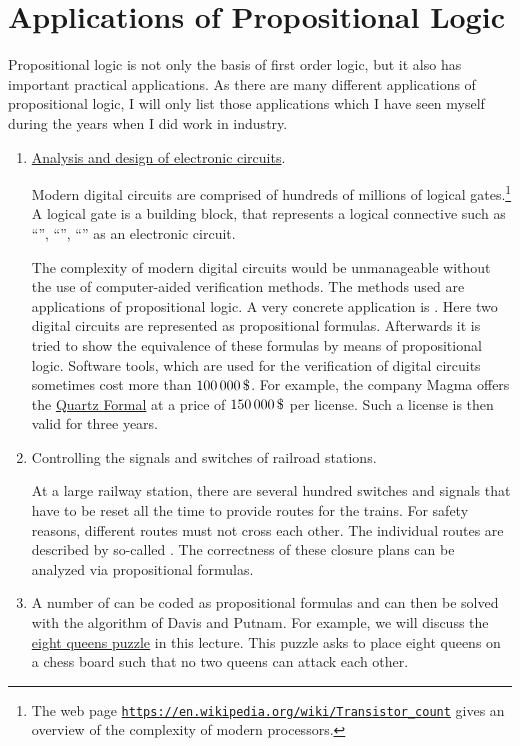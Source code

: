 \section{Applications of Propositional Logic}
Propositional logic is not only the basis of first order logic, but it also has important practical
applications.  As there are many different applications of propositional logic, I will only list those
applications which I have seen myself during the years when I did work in industry.
\begin{enumerate}
\item \href{https://en.wikipedia.org/wiki/Electronic_design_automation}{Analysis and design of electronic circuits}.

      Modern digital circuits are comprised of hundreds of millions of logical gates.\footnote{The web page
      \href{https://en.wikipedia.org/wiki/Transistor_count}{\texttt{https://en.wikipedia.org/wiki/Transistor\_count}}
      gives an overview of the complexity of modern processors.}
      A logical gate  is a building block, that represents a logical connective such as ``'',
      ``'', ``'' as an electronic circuit.

      The complexity of modern digital circuits would be unmanageable without
      the use of computer-aided verification methods.  The methods used are applications of propositional logic. 
      A very concrete application is .  Here two
      digital circuits are represented as propositional formulas.
      Afterwards it is tried to show the equivalence of these formulas by means of propositional logic.
      Software tools, which are used for the verification of digital
      circuits sometimes cost more than $100\,000\,\symbol{36}$.
      For example, the company Magma offers the 
      \href{https://www.eetimes.com/document.asp?doc_id=1217672}{Quartz Formal} at a price
      of $150\,000\,
      \symbol{36}$ per license.  Such a license is then valid for three years.


\item Controlling the signals and switches of railroad stations.

      At a large railway station, there are several hundred switches and signals that have to be 
      reset all the time to provide routes for the trains.
      For safety reasons, different routes must not cross each other.  
      The individual routes are described by so-called .
      The correctness of these closure plans can be analyzed via propositional formulas.
\item A number of  can be coded as propositional formulas and can then be solved with the
      algorithm of Davis and Putnam.
      For example, we will discuss the 
      \href{https://en.wikipedia.org/wiki/Eight_queens_puzzle}{eight queens puzzle} in this lecture.
      This puzzle asks to place eight queens on a chess board such that no two queens can attack each other.
\end{enumerate}

